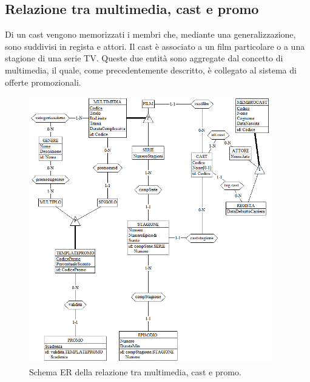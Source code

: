 \documentclass[a4paper,12pt]{report}
\begin{document}
	\subsection{Relazione tra multimedia, cast e promo}
	Di un cast vengono memorizzati i membri che, mediante una generalizzazione, sono suddivisi in regista e attori. Il cast è associato a un film particolare o a una stagione di una serie TV. Queste due entità sono aggregate dal concetto di multimedia, il quale, come precedentemente descritto, è collegato al sistema di offerte promozionali.
	\begin{figure}[H]
		\centering
		\includegraphics[width=300pt]{ER/multimediacastpromo.png}
		\caption{Schema ER della relazione tra multimedia, cast e promo.}
	\end{figure}
\end{document}

